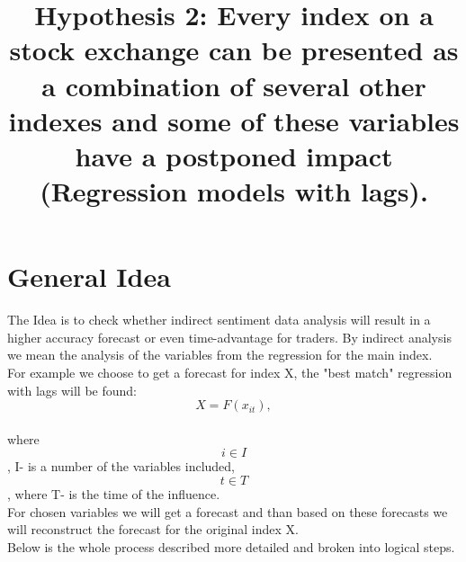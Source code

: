 \documentclass{article}
\title{Hypothesis 2: Every index on a stock exchange can be presented as a combination of several other indexes and some of these variables have a postponed impact (Regression models with lags).}
\begin{document}
\maketitle

\section{General Idea}
The Idea is to check whether indirect sentiment data analysis will result in a higher accuracy forecast or even time-advantage for traders. By indirect analysis we mean the analysis of the variables from the regression for the main index.\\
For example we choose to get a forecast for index X, the "best match" regression with lags will be found:\\
\[X = F(x_{it}),\]\\
where \[i\in I\], I- is a number of the variables included,\\
\[t \in T\], where T- is the time of the influence.\\
For chosen variables we will get a forecast and than based on these forecasts we will reconstruct the forecast for the original index X.\\
Below is the whole process described more detailed and broken into logical steps.
\end{document}
